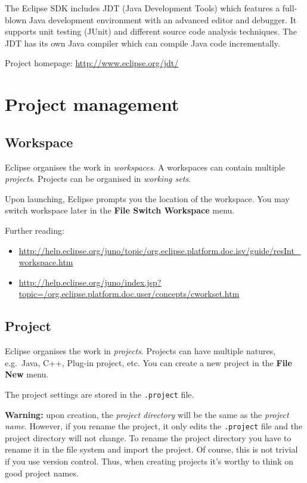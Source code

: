 \documentclass[]{report}
\begin{document}
The Eclipse SDK includes JDT (Java Development Tools) which features a
full-blown Java development environment with an advanced editor and
debugger. It supports unit testing (JUnit) and different source code
analysis techniques. The JDT has its own Java compiler which can compile
Java code incrementally.

Project homepage: \url{http://www.eclipse.org/jdt/}

\section{Project management}

\subsection{Workspace}

Eclipse organises the work in \emph{workspaces}. A workspaces can
contain multiple \emph{projects}. Projects can be organised in
\emph{working sets}.

Upon launching, Eclipse prompts you the location of the workspace. You
may switch workspace later in the \textbf{File \textbar{} Switch
Workspace} menu.

Further reading:

\begin{itemize}
\itemsep1pt\parskip0pt
\item
  \url{http://help.eclipse.org/juno/topic/org.eclipse.platform.doc.isv/guide/resInt_workspace.htm}
\item
  \url{http://help.eclipse.org/juno/index.jsp?topic=/org.eclipse.platform.doc.user/concepts/cworkset.htm}
\end{itemize}

\subsection{Project}

Eclipse organises the work in \emph{projects}. Projects can have
multiple natures, e.g.~Java, C++, Plug-in project, etc. You can create a
new project in the \textbf{File \textbar{} New} menu.

The project settings are stored in the \texttt{.project} file.

\textbf{Warning:} upon creation, the \emph{project directory} will be
the same as the \emph{project name}. However, if you rename the project,
it only edits the \texttt{.project} file and the project directory will
not change. To rename the project directory you have to rename it in the
file system and import the project. Of course, this is not trivial if
you use version control. Thus, when creating projects it's worthy to
think on good project names.
\end{document}
